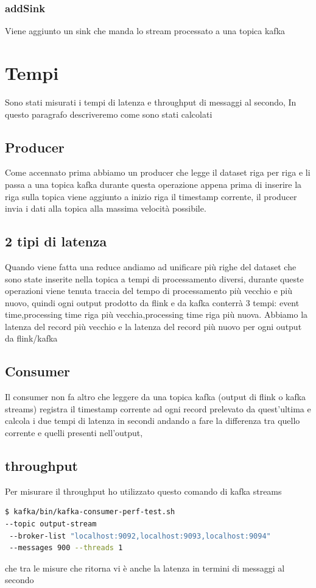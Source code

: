 \documentclass[acmsmall]{acmart}
\begin{document}
\subsubsection{addSink}
Viene aggiunto un sink che manda lo stream processato a una topica kafka


\section{Tempi}

Sono stati misurati i tempi di latenza e throughput di messaggi al secondo,
In questo paragrafo descriveremo come sono stati calcolati 


\subsection{Producer}
Come accennato prima abbiamo un producer che legge il dataset riga per riga  e li passa a una topica kafka durante questa operazione appena prima di inserire la riga sulla topica viene aggiunto a inizio riga il timestamp corrente, il producer invia i dati alla topica alla massima velocità possibile.


\subsection{2 tipi di latenza}
Quando viene fatta una reduce andiamo ad unificare più righe del dataset che sono state inserite nella topica a tempi di processamento diversi, durante queste operazioni viene tenuta traccia del tempo di processamento più vecchio e più nuovo, quindi ogni output prodotto da flink e da kafka conterrà 3 tempi:
event time,processing time riga più vecchia,processing time riga più nuova.
Abbiamo la latenza del record più vecchio e la latenza del record più nuovo
per ogni output da flink/kafka

\subsection{Consumer}
Il consumer non fa altro che leggere da una topica kafka (output di flink o kafka streams) registra il timestamp corrente ad ogni record prelevato da quest'ultima e calcola i due tempi di latenza in secondi andando a fare la differenza tra quello corrente e quelli presenti nell'output,

\subsection{throughput}
Per misurare il throughput ho utilizzato questo comando di kafka streams
\begin{lstlisting}[language=bash]
$ kafka/bin/kafka-consumer-perf-test.sh 
--topic output-stream
 --broker-list "localhost:9092,localhost:9093,localhost:9094" 
 --messages 900 --threads 1
\end{lstlisting}
che tra le misure che ritorna vi è anche la latenza in termini di messaggi al secondo
\\\\
\end{document}
